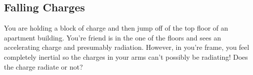 \subsection{Falling Charges}
	You are holding a block of charge and then jump off of the top floor of an apartment building.
	You're friend is in the one of the floors and sees an accelerating charge and presumably radiation.
	However, in you're frame, you feel completely inertial so the charges in your arms can't possibly be
	radiating! Does the charge radiate or not?
	\hspace*{15pt}{\scriptsize Credit: Ian G Wisher, UW-Madison}